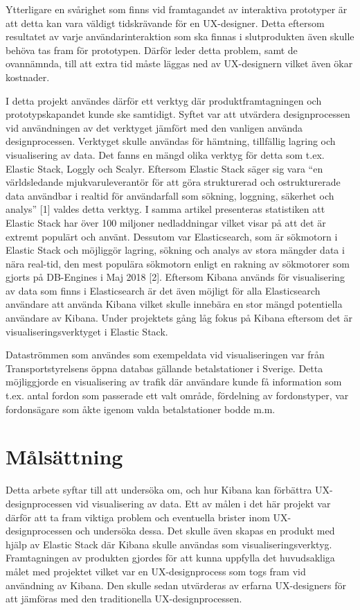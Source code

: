 \documentclass[12pt]{kththesis}
\begin{document}
Ytterligare en svårighet som finns vid framtagandet av interaktiva prototyper är att detta kan vara väldigt tidskrävande för en UX-designer. Detta eftersom resultatet av varje användarinteraktion som ska finnas i slutprodukten även skulle behöva tas fram för prototypen. Därför leder detta problem, samt de ovannämnda, till att extra tid måste läggas ned av UX-designern vilket även ökar kostnader. 

I detta projekt användes därför ett verktyg där produktframtagningen och prototypskapandet kunde ske samtidigt. Syftet var att utvärdera designprocessen vid användningen av det verktyget jämfört med den vanligen använda designprocessen. Verktyget skulle användas för hämtning, tillfällig lagring och visualisering av data. Det fanns en mängd olika verktyg för detta som t.ex. Elastic Stack, Loggly och Scalyr. Eftersom Elastic Stack säger sig vara “en världsledande mjukvaruleverantör för att göra strukturerad och ostrukturerade data användbar i realtid för användarfall som sökning, loggning, säkerhet och analys” [1] valdes detta verktyg. I samma artikel presenteras statistiken att Elastic Stack har över 100 miljoner nedladdningar vilket visar på att det är extremt populärt och använt. Dessutom var Elasticsearch, som är sökmotorn i Elastic Stack och möjliggör lagring, sökning och analys av stora mängder data i nära real-tid, den mest populära sökmotorn enligt en rakning av sökmotorer som gjorts på DB-Engines i Maj 2018 [2]. Eftersom Kibana används för visualisering av data som finns i Elasticsearch är det även möjligt för alla Elasticsearch användare att använda Kibana vilket skulle innebära en stor mängd potentiella användare av Kibana. Under projektets gång låg fokus på Kibana eftersom det är visualiseringsverktyget i Elastic Stack.

Dataströmmen som användes som exempeldata vid visualiseringen var från Transportstyrelsens öppna databas gällande betalstationer i Sverige. Detta möjliggjorde en visualisering av trafik där användare kunde få information som t.ex. antal fordon som passerade ett valt område, fördelning av fordonstyper, var fordonsägare som åkte igenom valda betalstationer bodde m.m.

\section{Målsättning}
Detta arbete syftar till att undersöka om, och hur Kibana kan förbättra UX-designprocessen vid visualisering av data. Ett av målen i det här projekt var därför att ta fram viktiga problem och eventuella brister inom UX-designprocessen och undersöka dessa. Det skulle även skapas en produkt med hjälp av Elastic Stack där Kibana skulle användas som visualiseringsverktyg. Framtagningen av produkten gjordes för att kunna uppfylla det huvudsakliga målet med projektet vilket var en UX-designprocess som togs fram vid användning av Kibana. Den skulle sedan utvärderas av erfarna UX-designers för att jämföras med den traditionella UX-designprocessen. 
\end{document}
